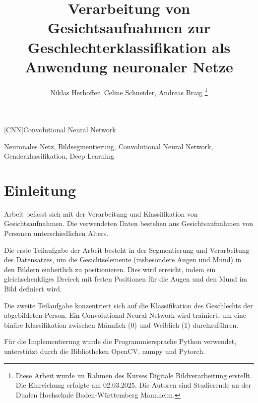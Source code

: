 \documentclass[journal,twoside,web]{ieeecolor}
\begin{document}
\begin{acronym}
    [CNN]{Convolutional Neural Network} 
\end{acronym}

\title{Verarbeitung von Gesichtsaufnahmen zur Geschlechterklassifikation als Anwendung neuronaler Netze}
\author{Niklas Herhoffer, Celine Schneider, Andreas Braig
\thanks{Diese Arbeit wurde im Rahmen des Kurses Digitale Bildverarbeitung erstellt. Die Einreichung erfolgte am 02.03.2025. Die Autoren sind Studierende an der Dualen Hochschule Baden-Württemberg Mannheim.}
}


\maketitle

    


\begin{IEEEkeywords}
    Neuronales Netz, Bildsegmentierung, Convolutional Neural Network, Genderklassifikation, Deep Learning
\end{IEEEkeywords}

\section{Einleitung}
\label{sec:introduction}
 Arbeit befasst sich mit der Verarbeitung und Klassifikation von Gesichtsaufnahmen. Die verwendeten Daten bestehen aus Gesichtsaufnahmen von Personen unterschiedlichen Alters. 

Die erste Teilaufgabe der Arbeit besteht in der Segmentierung und Verarbeitung des Datensatzes, um die Gesichtselemente (insbesondere Augen und Mund) in den Bildern einheitlich zu positionieren. Dies wird erreicht, indem ein gleichschenkliges Dreieck mit festen Positionen für die Augen und den Mund im Bild definiert wird. 

Die zweite Teilaufgabe konzentriert sich auf die Klassifikation des Geschlechts der abgebildeten Person. Ein Convolutional Neural Network wird trainiert, um eine binäre Klassifikation zwischen Männlich (0) und Weiblich (1) durchzuführen.

Für die Implementierung wurde die Programmiersprache Python verwendet, unterstützt durch die Bibliotheken OpenCV, numpy und Pytorch.
\end{document}
